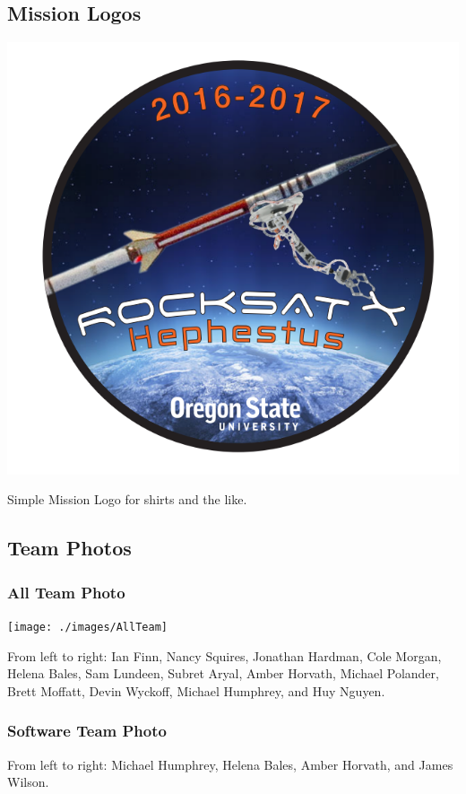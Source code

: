 \subsection{Mission Logos}
\includegraphics[width=\textwidth]{./images/logo}
\begin{center}
Simple Mission Logo for shirts and the like.
\end{center}

\subsection{Team Photos}
\subsubsection{All Team Photo}
\texttt{[image: ./images/AllTeam]}
\begin{center}
From left to right:
Ian Finn,
Nancy Squires,
Jonathan Hardman,
Cole Morgan,
Helena Bales,
Sam Lundeen,
Subret Aryal,
Amber Horvath,
Michael Polander,
Brett Moffatt,
Devin Wyckoff,
Michael Humphrey, and
Huy Nguyen.

\end{center}

\subsubsection{Software Team Photo}
\begin{center}
From left to right: Michael Humphrey, Helena Bales, Amber Horvath, and James Wilson.
\end{center}

